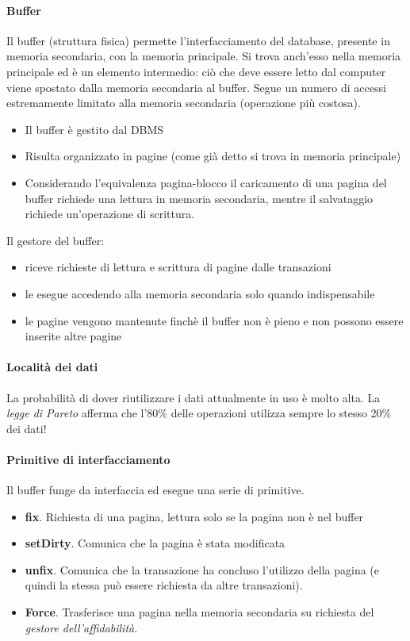 \paragraph{Buffer} Il buffer (struttura fisica) permette l'interfacciamento del database, presente in memoria secondaria, con la memoria principale. Si trova anch'esso nella memoria principale ed è un elemento intermedio: ciò che deve essere letto dal computer viene spostato dalla memoria secondaria al buffer. Segue un numero di accessi estremamente limitato alla memoria secondaria (operazione più costosa).
\begin{itemize}
	\item Il buffer è gestito dal DBMS
	\item Risulta organizzato in pagine (come già detto si trova in memoria principale)
	\item Considerando l'equivalenza pagina-blocco il caricamento di una pagina del buffer richiede una lettura in memoria secondaria, mentre il salvataggio richiede un'operazione di scrittura.
\end{itemize}
Il gestore del buffer:
\begin{itemize}
	\item riceve richieste di lettura e scrittura di pagine dalle transazioni
	\item le esegue accedendo alla memoria secondaria solo quando indispensabile
	\item le pagine vengono mantenute finchè il buffer non è pieno e non possono essere inserite altre pagine
\end{itemize}
\paragraph{Località dei dati} La probabilità di dover riutilizzare i dati attualmente in uso è molto alta. La \emph{legge di Pareto} afferma che l'80\% delle operazioni utilizza sempre lo stesso 20\% dei dati!
\paragraph{Primitive di interfacciamento} Il buffer funge da interfaccia ed esegue una serie di primitive.
\begin{itemize}
	\item \textbf{fix}. Richiesta di una pagina, lettura solo se la pagina non è nel buffer
	\item \textbf{setDirty}. Comunica che la pagina è stata modificata
	\item \textbf{unfix}. Comunica che la transazione ha concluso l'utilizzo della pagina (e quindi la stessa può essere richiesta da altre transazioni).
	\item \textbf{Force}. Trasferisce una pagina nella memoria secondaria su richiesta del \emph{gestore dell'affidabilità}.
\end{itemize}

